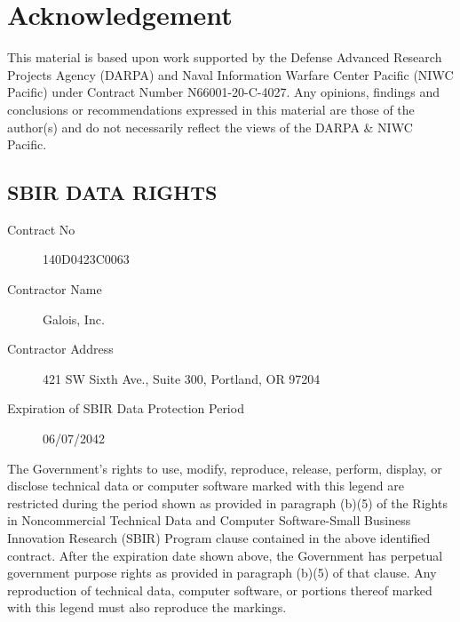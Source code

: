 \section{Acknowledgement}

This material is based upon work supported by the Defense Advanced Research Projects Agency (DARPA) and Naval Information Warfare Center Pacific (NIWC Pacific) under Contract Number N66001-20-C-4027.
Any opinions, findings and conclusions or recommendations expressed in this material are those of the author(s) and do not necessarily reflect the views of the DARPA \& NIWC Pacific.

\subsection*{SBIR DATA RIGHTS}

\begin{description}
\item[Contract No] 140D0423C0063
\item[Contractor Name] Galois, Inc.
\item[Contractor Address] 421 SW Sixth Ave., Suite 300, Portland, OR 97204
\item[Expiration of SBIR Data Protection Period] 06/07/2042
\end{description}

The Government's rights to use, modify, reproduce, release, perform, display, or disclose technical data or computer software marked with this legend are restricted during the period shown as provided in paragraph (b)(5) of the Rights in Noncommercial Technical Data and Computer Software-Small Business Innovation Research (SBIR) Program clause contained in the above identified contract.
After the expiration date shown above, the Government has perpetual government purpose rights as provided in paragraph (b)(5) of that clause.
Any reproduction of technical data, computer software, or portions thereof marked with this legend must also reproduce the markings.

